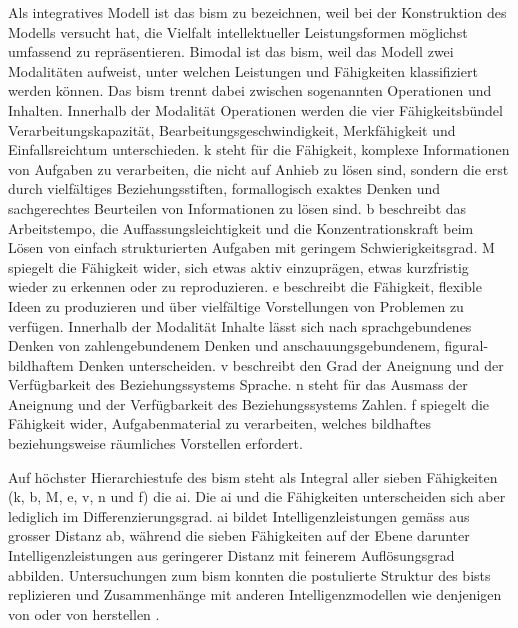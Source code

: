 \documentclass[11pt, twoside, a4paper]{book}		%
\begin{document}
Als integratives Modell ist das \gls{bism} zu bezeichnen, weil \citet{Jaeger1984} bei der Konstruktion des Modells versucht hat, die Vielfalt intellektueller Leistungsformen möglichst umfassend zu repräsentieren.
Bimodal ist das \gls{bism}, weil das Modell zwei Modalitäten aufweist, unter welchen Leistungen und Fähigkeiten klassifiziert werden können. 
Das \gls{bism} trennt dabei zwischen sogenannten Operationen und Inhalten. Innerhalb der Modalität Operationen werden die vier Fähigkeitsbündel Verarbeitungskapazität, Bearbeitungsgeschwindigkeit, Merkfähigkeit und Einfallsreichtum unterschieden. 
\gls{k} steht für die Fähigkeit, komplexe Informationen von Aufgaben zu verarbeiten, die nicht auf Anhieb zu lösen sind, sondern die erst durch vielfältiges Beziehungsstiften, formallogisch exaktes Denken und sachgerechtes Beurteilen von Informationen zu lösen sind. 
\gls{b} beschreibt das Arbeitstempo, die Auffassungsleichtigkeit und die Konzentrationskraft beim Lösen von einfach strukturierten Aufgaben mit geringem Schwierigkeitsgrad. 
\gls{M} spiegelt die Fähigkeit wider, sich etwas aktiv einzuprägen, etwas kurzfristig wieder zu erkennen oder zu reproduzieren. 
\gls{e} beschreibt die Fähigkeit, flexible Ideen zu produzieren und über vielfältige Vorstellungen von Problemen zu verfügen. 
Innerhalb der Modalität Inhalte lässt sich nach \citet{Jaeger1984} sprachgebundenes Denken von zahlengebundenem Denken und anschauungsgebundenem, figural-bildhaftem Denken unterscheiden.
\Gls{v} beschreibt den Grad der Aneignung und der Verfügbarkeit des Beziehungssystems Sprache.
\Gls{n} steht für das Ausmass der Aneignung und der Verfügbarkeit des Beziehungssystems Zahlen.
\Gls{f} spiegelt die Fähigkeit wider, Aufgabenmaterial zu verarbeiten, welches bildhaftes beziehungsweise räumliches Vorstellen erfordert.

Auf höchster Hierarchiestufe des \gls{bism} steht als Integral aller sieben Fähigkeiten (\gls{k}, \gls{b}, \gls{M}, \gls{e}, \gls{v}, \gls{n} und \gls{f}) die \gls{ai}. Die \gls{ai} und die Fähigkeiten unterscheiden sich aber lediglich im Differenzierungsgrad. \gls{ai} bildet Intelligenzleistungen gemäss \citet{Jaeger1984} aus grosser Distanz ab, während die sieben Fähigkeiten auf der Ebene darunter Intelligenzleistungen aus geringerer Distanz mit feinerem Auflösungsgrad abbilden. Untersuchungen zum \gls{bism} konnten die postulierte Struktur des \gls{bist}s replizieren  und Zusammenhänge mit anderen Intelligenzmodellen wie denjenigen von \citet{Cattell1971}  oder von \citet{Carroll1993} herstellen \citep{Bucik1996, Beauducel2002, Suess2002}.
\end{document}
